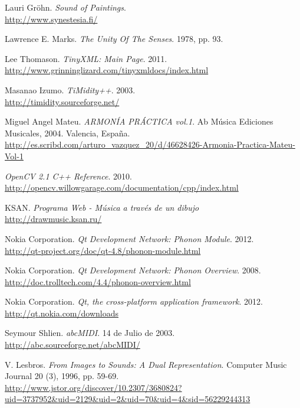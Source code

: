 \begin{thebibliography}{9}
Lauri Gröhn. \emph{Sound of Paintings}.\\
\url{http://www.synestesia.fi/}

 Lawrence E. Marks. \emph{The Unity Of The Senses}. 1978, pp. 93.
 
  Lee Thomason. \emph{TinyXML: Main Page}. 2011.\\
  \url{http://www.grinninglizard.com/tinyxmldocs/index.html}

  Masanao Izumo. \emph{TiMidity++}. 2003.\\
  \url{http://timidity.sourceforge.net/}
  
	Miguel Angel Mateu. \emph{ARMONÍA PRÁCTICA vol.1}. Ab Música Ediciones Musicales, 2004. Valencia, España.\\
	\url{http://es.scribd.com/arturo_vazquez_20/d/46628426-Armonia-Practica-Mateu-Vol-1}
  
  \emph{OpenCV 2.1 C++ Reference}. 2010.\\
  \url{http://opencv.willowgarage.com/documentation/cpp/index.html}

 KSAN. \emph{Programa Web - Música a través de un dibujo}\\
\url{http://drawmusic.ksan.ru/}

  Nokia Corporation. \emph{Qt Development Network: Phonon Module}. 2012.\\
 \url{http://qt-project.org/doc/qt-4.8/phonon-module.html}
 
  Nokia Corporation. \emph{Qt Development Network: Phonon Overview}. 2008.\\
 \url{http://doc.trolltech.com/4.4/phonon-overview.html}

  Nokia Corporation. \emph{Qt, the cross-platform application framework}. 2012.\\
  \url{http://qt.nokia.com/downloads} 
 
  Seymour Shlien. \emph{abcMIDI}. 14 de Julio de 2003.\\
  \url{http://abc.sourceforge.net/abcMIDI/} 

 V. Lesbros. \emph{From Images to Sounds: A Dual Representation}. Computer Music Journal 20 (3), 1996, pp. 59-69.\\
 \url{http://www.jstor.org/discover/10.2307/3680824?uid=3737952&uid=2129&uid=2&uid=70&uid=4&sid=56229244313}


\end{thebibliography}

